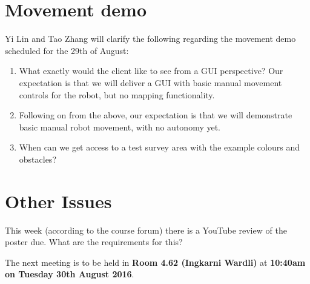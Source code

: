 \documentclass[11pt, a4paper]{article}
\begin{document}
\section{Movement demo}

Yi Lin and Tao Zhang will clarify the following regarding the movement demo scheduled for the 29th of August:

\begin{enumerate}

\item What exactly would the client like to see from a GUI perspective? Our expectation is that we will deliver a GUI with basic manual movement controls for the robot, but no mapping functionality.

\item Following on from the above, our expectation is that we will demonstrate basic manual robot movement, with no autonomy yet.

\item When can we get access to a test survey area with the example colours and obstacles?

\end{enumerate}
 
 


\section{Other Issues}

This week (according to the course forum) there is a YouTube review of the poster due. What are the requirements for this?


\vspace*{10pt}

\noindent The next meeting is to be held in {\bf Room 4.62 (Ingkarni Wardli)} at {\bf 10:40am on Tuesday 30th August 2016}.
\end{document}
